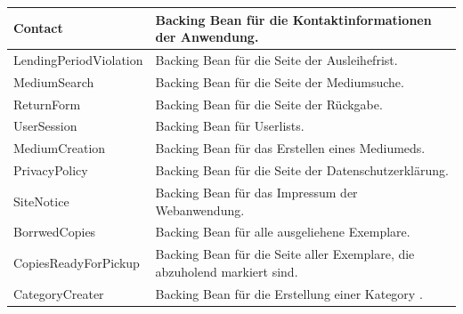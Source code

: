 \documentclass{article}
\begin{document}
\begin{center}
\begin{table}
\begin{tabular} { |p{}|p{}| }
            \hline
            Contact & Backing Bean für die Kontaktinformationen der Anwendung.\\
            \hline
            LendingPeriodViolation & Backing Bean für die Seite der Ausleihefrist.\\
            \hline
            MediumSearch & Backing Bean für die Seite der Mediumsuche.\\
            \hline
            ReturnForm & Backing Bean für die Seite der Rückgabe.\\
            \hline
            UserSession & Backing Bean für Userlists.\\
            \hline
            MediumCreation & Backing Bean für das Erstellen eines  Mediumeds.\\
            \hline
            PrivacyPolicy & Backing Bean für die Seite der Datenschutzerklärung.\\
            \hline
            SiteNotice & Backing Bean für das Impressum der  Webanwendung.\\
            \hline
            BorrwedCopies & Backing Bean für alle ausgeliehene Exemplare.\\
            \hline
            CopiesReadyForPickup & Backing Bean für die Seite aller Exemplare, die abzuholend markiert sind.\\
            \hline
            CategoryCreater & Backing Bean für die Erstellung einer Kategory .\\
            \hline
        \end{tabular}
    \end{table}
\end{center}
\end{document}
